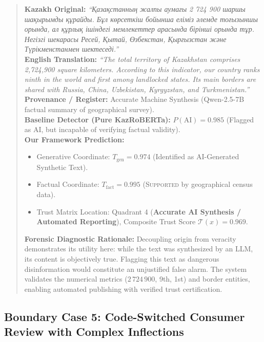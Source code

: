\begin{quote}
\textbf{Kazakh Original:} \textit{``Қазақстанның жалпы аумағы 2 724 900 шаршы шақырымды құрайды. Бұл көрсеткіш бойынша еліміз әлемде тоғызыншы орында, ал құрлық ішіндегі мемлекеттер арасында бірінші орында тұр. Негізгі шекарасы Ресей, Қытай, Өзбекстан, Қырғызстан және Түрікменстанмен шектеседі.''} \\
\textbf{English Translation:} \textit{``The total territory of Kazakhstan comprises 2,724,900 square kilometers. According to this indicator, our country ranks ninth in the world and first among landlocked states. Its main borders are shared with Russia, China, Uzbekistan, Kyrgyzstan, and Turkmenistan.''} \\
\textbf{Provenance / Register:} Accurate Machine Synthesis (Qwen-2.5-7B factual summary of geographical survey). \\
\textbf{Baseline Detector (Pure KazRoBERTa):} $P(\text{AI}) = 0.985$ (Flagged as AI, but incapable of verifying factual validity). \\
\textbf{Our Framework Prediction:}
\begin{itemize}
    \item Generative Coordinate: $T_{\text{gen}} = 0.974$ (Identified as AI-Generated Synthetic Text).
    \item Factual Coordinate: $T_{\text{fact}} = 0.995$ (\textsc{Supported} by geographical census data).
    \item Trust Matrix Location: Quadrant 4 (\textbf{Accurate AI Synthesis / Automated Reporting}), Composite Trust Score $\mathcal{T}(x) = 0.969$.
\end{itemize}
\textbf{Forensic Diagnostic Rationale:} Decoupling origin from veracity demonstrates its utility here: while the text was synthesized by an LLM, its content is objectively true. Flagging this text as dangerous disinformation would constitute an unjustified false alarm. The system validates the numerical metrics ($2\,724\,900$, 9th, 1st) and border entities, enabling automated publishing with verified trust certification.
\end{quote}

\subsection{Boundary Case 5: Code-Switched Consumer Review with Complex Inflections}
\label{sec:app_case_b5}

